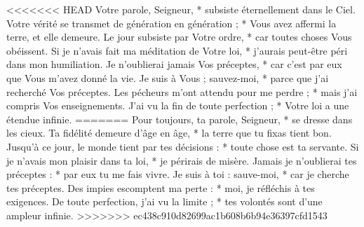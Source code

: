 <<<<<<< HEAD
Votre parole, Seigneur, * subsiste éternellement dans le Ciel.
\versseparator
Votre vérité se transmet de génération en génération ; * Vous avez affermi la terre, et elle demeure.
\versseparator
Le jour subsiste par Votre ordre, * car toutes choses Vous obéissent.
\versseparator
Si je n'avais fait ma méditation de Votre loi, * j'aurais peut-être péri dans mon humiliation.
\versseparator
Je n'oublierai jamais Vos préceptes, * car c'est par eux que Vous m'avez donné la vie.
\versseparator
Je suis à Vous ; sauvez-moi, * parce que j'ai recherché Vos préceptes.
\versseparator
Les pécheurs m'ont attendu pour me perdre ; * mais j'ai compris Vos enseignements.
\versseparator
J'ai vu la fin de toute perfection ; * Votre loi a une étendue infinie.
=======
Pour toujours, ta parole, Seigneur, *
se dresse dans les cieux.
\versseparator
Ta fidélité demeure d’âge en âge, *
la terre que tu fixas tient bon.
\versseparator
Jusqu’à ce jour, le monde tient par tes décisions : *
toute chose est ta servante.
\versseparator
Si je n’avais mon plaisir dans ta loi, *
je périrais de misère.
\versseparator
Jamais je n’oublierai tes préceptes : *
par eux tu me fais vivre.
\versseparator
Je suis à toi : sauve-moi, *
car je cherche tes préceptes.
\versseparator
Des impies escomptent ma perte : *
moi, je réfléchis à tes exigences.
\versseparator
De toute perfection, j’ai vu la limite ; *
tes volontés sont d’une ampleur infinie.
>>>>>>> ec438c910d82699ac1b608b6b94e36397cfd1543
